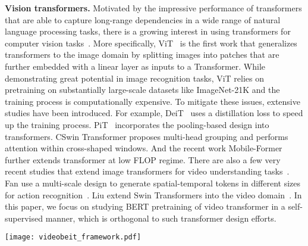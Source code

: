 \documentclass[10pt,twocolumn,letterpaper]{article}
\makeatletter
\newcommand*{\system}{BEVT\@\xspace}
\makeatother
\begin{document}
\vspace{0.05in}
\noindent \textbf{Vision transformers.} Motivated by the impressive performance of transformers that are able to capture long-range dependencies in a wide range of natural language processing tasks, there is a growing interest in using transformers for computer vision tasks~\cite{parmar2018image,zhou2018end,dosovitskiy2020image,liu2021swin,fan2021multiscale,deit}. More specifically,  ViT~\cite{dosovitskiy2020image} is the first work that generalizes transformers to the image domain by splitting images into patches that are further embedded with a linear layer as inputs to a Transformer. While demonstrating great potential in image recognition tasks, ViT relies on pretraining on substantially large-scale datasets like ImageNet-21K and the training process is computationally expensive. To mitigate these issues, extensive studies have been introduced. For example, DeiT~\cite{deit} uses a distillation loss to speed up the training process. PiT~\cite{DBLP:conf/cvpr/HanYHY21} incorporates the pooling-based design into transformers. CSwin Transformer \cite{dong2021cswin} proposes multi-head grouping and performs attention within cross-shaped windows. And the recent work Mobile-Former \cite{chen2021mobile} further extends transformer at low FLOP regime. There are also a few very recent studies that extend image transformers for video understanding tasks~\cite{fan2021multiscale,arnab2021vivit,liu2021video}. Fan \etal use a multi-scale design to generate spatial-temporal tokens in different sizes for action recognition~\cite{fan2021multiscale}. Liu \etal extend Swin Transformers into the video domain~\cite{liu2021video}. In this paper, we focus on studying BERT pretraining of video transformer in a self-supervised manner, which is orthogonal to such transformer design efforts.

 \begin{figure*}[t]
\begin{center}
   \texttt{[image: videobeit\_framework.pdf]}
\end{center}
   \vspace{-0.2in}
   \caption{An overview of our framework. \system contains an image stream and a video stream that learns video representations jointly using a BERT-style objective. In particular, the image and video stream, operating on single images and video cubes, respectively, predict masked image patches and 3D cubes derived from a tokenizer. }
\label{fig:framework}
\end{figure*}
\end{document}
